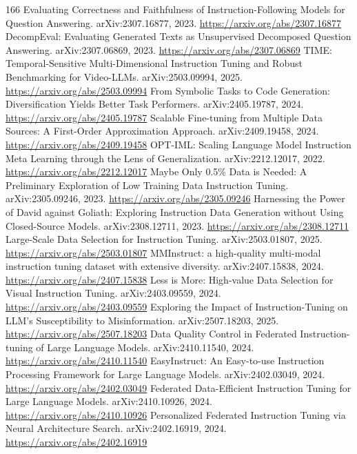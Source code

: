 \documentclass[11pt]{article}
\begin{document}
\begin{thebibliography}{166}
 Evaluating Correctness and Faithfulness of Instruction-Following Models for Question Answering. arXiv:2307.16877, 2023. \url{https://arxiv.org/abs/2307.16877}
 DecompEval: Evaluating Generated Texts as Unsupervised Decomposed Question Answering. arXiv:2307.06869, 2023. \url{https://arxiv.org/abs/2307.06869}
 TIME: Temporal-Sensitive Multi-Dimensional Instruction Tuning and Robust Benchmarking for Video-LLMs. arXiv:2503.09994, 2025. \url{https://arxiv.org/abs/2503.09994}
 From Symbolic Tasks to Code Generation: Diversification Yields Better Task Performers. arXiv:2405.19787, 2024. \url{https://arxiv.org/abs/2405.19787}
 Scalable Fine-tuning from Multiple Data Sources: A First-Order Approximation Approach. arXiv:2409.19458, 2024. \url{https://arxiv.org/abs/2409.19458}
 OPT-IML: Scaling Language Model Instruction Meta Learning through the Lens of Generalization. arXiv:2212.12017, 2022. \url{https://arxiv.org/abs/2212.12017}
 Maybe Only 0.5\% Data is Needed: A Preliminary Exploration of Low Training Data Instruction Tuning. arXiv:2305.09246, 2023. \url{https://arxiv.org/abs/2305.09246}
 Harnessing the Power of David against Goliath: Exploring Instruction Data Generation without Using Closed-Source Models. arXiv:2308.12711, 2023. \url{https://arxiv.org/abs/2308.12711}
 Large-Scale Data Selection for Instruction Tuning. arXiv:2503.01807, 2025. \url{https://arxiv.org/abs/2503.01807}
 MMInstruct: a high-quality multi-modal instruction tuning dataset with extensive diversity. arXiv:2407.15838, 2024. \url{https://arxiv.org/abs/2407.15838}
 Less is More: High-value Data Selection for Visual Instruction Tuning. arXiv:2403.09559, 2024. \url{https://arxiv.org/abs/2403.09559}
 Exploring the Impact of Instruction-Tuning on LLM's Susceptibility to Misinformation. arXiv:2507.18203, 2025. \url{https://arxiv.org/abs/2507.18203}
 Data Quality Control in Federated Instruction-tuning of Large Language Models. arXiv:2410.11540, 2024. \url{https://arxiv.org/abs/2410.11540}
 EasyInstruct: An Easy-to-use Instruction Processing Framework for Large Language Models. arXiv:2402.03049, 2024. \url{https://arxiv.org/abs/2402.03049}
 Federated Data-Efficient Instruction Tuning for Large Language Models. arXiv:2410.10926, 2024. \url{https://arxiv.org/abs/2410.10926}
 Personalized Federated Instruction Tuning via Neural Architecture Search. arXiv:2402.16919, 2024. \url{https://arxiv.org/abs/2402.16919}

\end{thebibliography}
\end{document}
